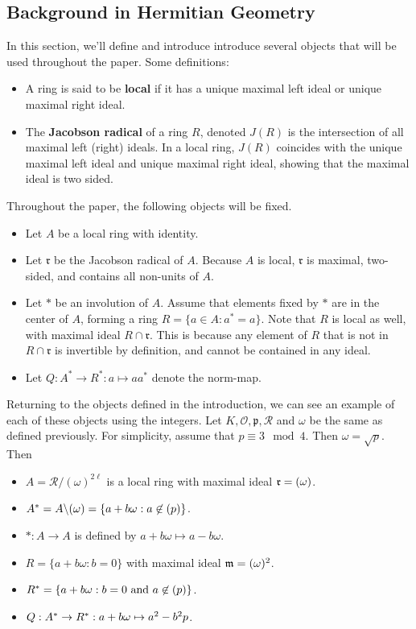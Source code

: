 \begin{center}
\section{Background in Hermitian Geometry}
\end{center}
In this section, we'll define and introduce introduce several objects that will be used throughout the paper.
Some definitions:
\begin{itemize}
\item A ring is said to be \textbf{local} if it has a unique maximal left ideal or unique maximal right ideal.
\item The \textbf{Jacobson radical} of a ring $R$, denoted $J(R)$ is the intersection of all maximal left (right) ideals. In a local ring, $J(R)$ coincides with the unique maximal left ideal and unique maximal right ideal, showing that the maximal ideal is two sided.
\end{itemize}

Throughout the paper, the following objects will be fixed.
\begin{itemize}
\item Let $A$ be a local ring with identity.
\item Let $\mathfrak{r}$ be the Jacobson radical of $A$. Because $A$ is local, $\mathfrak{r}$ is maximal, two-sided, and contains all non-units of $A$.
\item Let $*$ be an involution of $A$. Assume that elements fixed by $*$ are in the center of $A$, forming a ring $R = \{a \in A: a^* = a\}$.
Note that $R$ is local as well, with maximal ideal $R \cap \mathfrak{r}$. This is because any element of $R$ that is not in $R \cap \mathfrak{r}$ is invertible by definition, and cannot be contained in any ideal.
\item Let $Q: A^* \to R^*: a \mapsto aa^*$ denote the norm-map.
\end{itemize}

\begin{example}\label{ex2.1}
Returning to the objects defined in the introduction, we can see an example of each of these objects using the \padic integers.
Let $K, \mathcal{O}, \mathfrak{p}, \mathcal{R}$ and $\omega$ be the same as defined previously.
For simplicity, assume that $p \equiv 3 \mod 4$.
Then $\omega = \sqrt{p}$.
Then
\begin{itemize}
\item $A = \mathcal{R}/(\omega)^{2\ell}$ is a local ring with maximal ideal $\mathfrak{r} = (\omega)$.
\item $A^* = A \backslash (\omega) = \{a + b \omega : a \not\in (p) \}$.
\item $*: A \to A$ is defined by $a + b\omega \mapsto a - b\omega$.
\item $R = \{a + b\omega : b = 0\}$ with maximal ideal $\mathfrak{m} = (\omega)^2$.
\item $R^* = \{a + b\omega: b = 0 \text{ and } a \not\in (p)\}$.
\item $Q: A^* \to R^*: a + b\omega \mapsto a^2 - b^2 p$.
\end{itemize}
\end{example}

